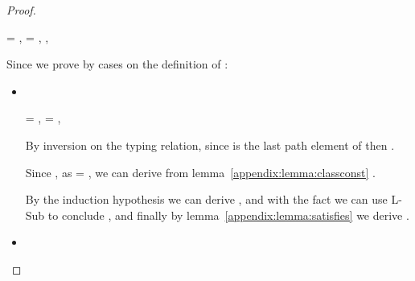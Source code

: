 \begin{lemma}
\begin{proof}
\begin{itemize}
\begin{subcase}[\isaopsem{\class{1}}{\class{2}} = {\true{}}, \text{if}\ \issubtypein{}{\class{1}}{\class{2}}]
               = ,  = ,
              ,
              \istrueval{\val{}}
              
              Since \istrueval{\val{}} we prove {\satisfies{\openv{}}{\thenprop{\prop{}}}}
              by cases on the definition of \isacompareliteral{}:
              \begin{itemize} %
                \item[]
                  \begin{subcase}[\isacompare{\s{}}{\pth{\classpe{}}{\pth{\pathelem{}}{\x{}}}}{\Value{\class{}}}
                                 {\filterset{\isprop{\class{}} {\pth{\pathelem{}}{\x{}}}}
                                            {\notprop{\class{}}{\pth{\pathelem{}}{\x{}}}}}]
                    \ 


                     = {\pth{\classpe{}}{\pth{\pathelem{}}{\x{}}}},
                     = {},

                    By inversion on the typing relation, since \classpe{} is the last path element of 
                    then .

                    Since {},
                    as {} = {},
                    we can derive from lemma~\ref{appendix:lemma:classconst}
                    {}.

                    By the induction hypothesis we can derive 
                    {},
                    and with the fact {}
                    we can use L-Sub to conclude 
                    {},
                    and finally by lemma~\ref{appendix:lemma:satisfies}
                    we derive
                    {}.

                  \end{subcase}
                \item[]
                  \begin{subcase}
                    \ 


\end{subcase}
\end{itemize}
\end{subcase}
\end{itemize}
\end{proof}
\end{lemma}
